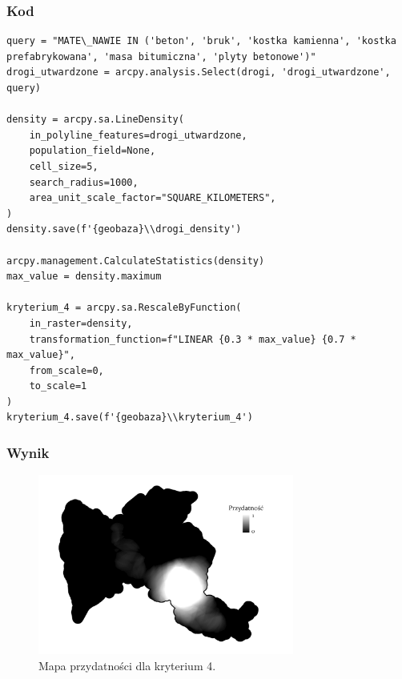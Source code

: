 \documentclass{article}
\begin{document}
\subsubsection{Kod}
\begin{lstlisting}
query = "MATE\_NAWIE IN ('beton', 'bruk', 'kostka kamienna', 'kostka prefabrykowana', 'masa bitumiczna', 'plyty betonowe')"
drogi_utwardzone = arcpy.analysis.Select(drogi, 'drogi_utwardzone', query)

density = arcpy.sa.LineDensity(
    in_polyline_features=drogi_utwardzone,
    population_field=None,
    cell_size=5,
    search_radius=1000,
    area_unit_scale_factor="SQUARE_KILOMETERS",
)
density.save(f'{geobaza}\\drogi_density')

arcpy.management.CalculateStatistics(density)
max_value = density.maximum

kryterium_4 = arcpy.sa.RescaleByFunction(
    in_raster=density,
    transformation_function=f"LINEAR {0.3 * max_value} {0.7 * max_value}",
    from_scale=0,
    to_scale=1   
)
kryterium_4.save(f'{geobaza}\\kryterium_4')
\end{lstlisting}

\subsubsection{Wynik}
\begin{figure}[H]
    \centering
    \includegraphics[width=0.75\textwidth]{img/kryterium4-layout.jpg}
    \caption*{Mapa przydatności dla kryterium 4.}
\end{figure}
\end{document}
